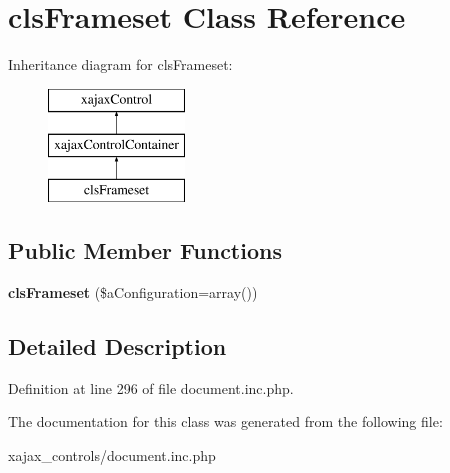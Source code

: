 \hypertarget{classclsFrameset}{
\section{clsFrameset Class Reference}
\label{classclsFrameset}
}
Inheritance diagram for clsFrameset:\begin{figure}[H]
\begin{center}
\leavevmode
\includegraphics[height=3.000000cm]{classclsFrameset}
\end{center}
\end{figure}
\subsection*{Public Member Functions}
\begin{DoxyCompactItemize}
\item 
\hypertarget{classclsFrameset_adaa8009a91ac52797f4b9d7e697e3d0e}{
{\bfseries clsFrameset} (\$aConfiguration=array())}
\label{classclsFrameset_adaa8009a91ac52797f4b9d7e697e3d0e}

\end{DoxyCompactItemize}


\subsection{Detailed Description}


Definition at line 296 of file document.inc.php.



The documentation for this class was generated from the following file:\begin{DoxyCompactItemize}
\item 
xajax\_\-controls/document.inc.php\end{DoxyCompactItemize}
